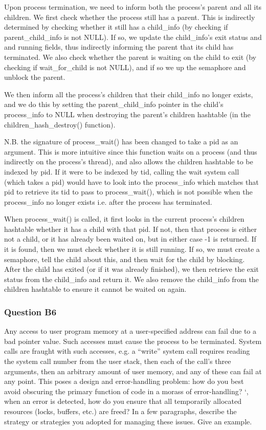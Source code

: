 Upon process termination, we need to inform both the process's parent and all its children. We first check whether the process still has a parent. This is indirectly determined by checking whether it still has a child\_info (by checking if parent\_child\_info is not NULL). If so, we update the child\_info's exit status and and running fields, thus indirectly informing the parent that its child has terminated. We also check whether the parent is waiting on the child to exit (by checking if wait\_for\_child is not NULL), and if so we up the semaphore and unblock the parent.

We then inform all the process's children that their child\_info no longer exists, and we do this by setting the parent\_child\_info pointer in the child's process\_info to NULL when destroying the parent's children hashtable (in the children\_hash\_destroy() function).

N.B. the signature of process\_wait() has been changed to take a pid as an argument. This is more intuitive since this function waits on a process (and thus indirectly on the process's thread), and also allows the children hashtable to be indexed by pid. If it were to be indexed by tid, calling the wait system call (which takes a pid) would have to look into the process\_info which matches that pid to retrieve its tid to pass to process\_wait(), which is not possible when the process\_info no longer exists i.e. after the process has terminated.

When process\_wait() is called, it first looks in the current process's children hashtable whether it has a child with that pid. If not, then that process is either not a child, or it has already been waited on, but in either case -1 is returned. If it is found, then we must check whether it is still running. If so, we must create a semaphore, tell the child about this, and then wait for the child by blocking. After the child has exited (or if it was already finished), we then retrieve the exit status from the child\_info and return it. We also remove the child\_info from the children hashtable to ensure it cannot be waited on again.

\subsubsection*{Question B6} %
Any access to user program memory at a user-specified address can fail due to a bad pointer value.  Such accesses must cause the process to be terminated.  System calls are fraught with such accesses, e.g. a ``write'' system call requires reading the system call number from the user stack, then each of the call's three arguments, then an arbitrary amount of user memory, and any of these can fail at any point.  This poses a design and error-handling problem: how do you best avoid obscuring the primary function of code in a morass of error-handling?  `, when an error is detected, how do you ensure that all temporarily allocated resources (locks, buffers, etc.) are freed?  In a few paragraphs, describe the strategy or strategies you adopted for managing these issues.  Give an example.

